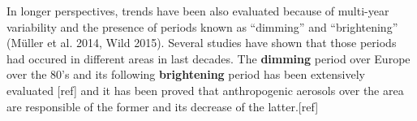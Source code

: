 In longer perspectives, trends have been also evaluated because of multi-year variability and the presence of periods known as “dimming” and “brightening” (Müller et al. 2014, Wild 2015). Several studies have shown that those periods had occured in different areas in last decades. The \textbf{dimming} period over Europe over the 80's and its following \textbf{brightening} period has been extensively evaluated [ref] and it has been proved that anthropogenic aerosols over the area are responsible of the former and its decrease of the latter.[ref]
 










